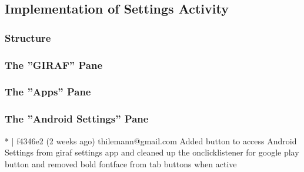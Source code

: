 \subsection{Implementation of Settings Activity}

\subsubsection{Structure}

\subsubsection{The ''GIRAF'' Pane}


\subsubsection{The ''Apps'' Pane}


 \subsubsection{The ''Android Settings'' Pane}
 * | f4346e2 (2 weeks ago) thilemann@gmail.com Added button to access Android Settings from giraf settings app and cleaned up the onclicklistener for google play button and removed bold fontface from tab buttons when active\\